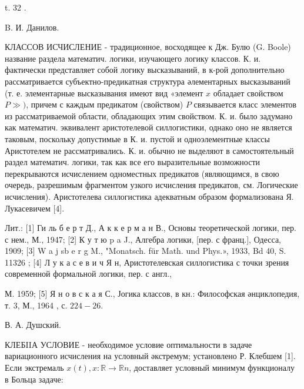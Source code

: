 \documentclass[10pt]{article}
\begin{document}
t. 32 .

B. И. Данилов.



КЛАССОВ ИСЧИСЛЕНИЕ - традиционное, восходящее к Дж. Булю (G. Boole) название раздела математич. логики, изучающего логику классов. К. и. фактически представляет собой логику высказываний, в к-рой дополнительно рассматривается субъектно-предикатная структура әлементарных высказываний (т. е. элементарные высказывания имеют вид «элемент $x$ обладает свойством $P \gg)$, причем с каждым предикатом (свойством) $P$ связывается класс элементов из рассматриваемой области, обладающих этим свойством. К. и. было задумано как математич. эквивалент аристотелевой силлогистики, однако оно не является таковым, поскольку допустимые в К. и. пустой и одноэлементные классы Аристотелем не рассматривались. К. и. обычно не выделяют в самостоятельный раздел математич. логики, так как все его выразительные возможности перекрываются исчислением одноместных предикатов (являющимся, в свою очередь, разрешимым фрагментом узкого исчисления предикатов, см. Логические исчисления). Аристотелева силлогистика адекватным образом формализована Я. Лукасевичем [4].



Лит.: [1] Ги ль б е р т Д., А к к е р м а н В., Основы теоретической логики, пер. с нем., М., 1947; [2] К у т ю p a J., Алгебра логики, [пер. с франц.], Одесса, 1909; [3] W a j sb e r g M., "Monatsch. für Math. und Phys.», 1933, Bd 40, S. 11326 ; [4] Л у к а с е в и ч Я н, Аристотелевская силлогистика с точки зрения современной формальной логики, пер. с англ.,

М. 1959; [5] Я н о в с к а я С., Јогика классов, в кн.: Философская әнциклопедия, т. 3, М., 1964 , с. $224-26$.



В. А. Душский.



КЛЕБIIА УСЛОВИЕ - необходимое условие оптимальности в задаче вариационного исчисления на условный әкстремум; установлено Р. Клебшем [1]. Если экстремаль $x(t), x: \mathbb{R} \rightarrow \mathbb{R} n$, доставляет условный минимум функционалу в Больца задаче:
\end{document}
